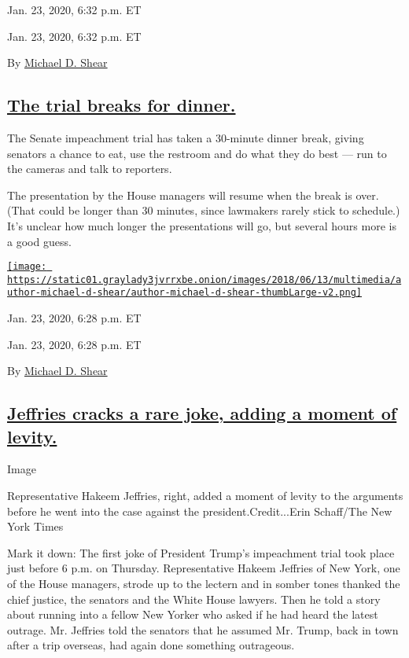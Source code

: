 Jan. 23, 2020, 6:32 p.m. ET

Jan. 23, 2020, 6:32 p.m. ET

By \href{https://www.nytimes3xbfgragh.onion/by/michael-d-shear}{Michael
D. Shear}

\hypertarget{the-trial-breaks-for-dinner}{%
\subsection{\texorpdfstring{\protect\hyperlink{the-trial-breaks-for-dinner}{The
trial breaks for
dinner.}}{The trial breaks for dinner.}}\label{the-trial-breaks-for-dinner}}

The Senate impeachment trial has taken a 30-minute dinner break, giving
senators a chance to eat, use the restroom and do what they do best ---
run to the cameras and talk to reporters.

The presentation by the House managers will resume when the break is
over. (That could be longer than 30 minutes, since lawmakers rarely
stick to schedule.) It's unclear how much longer the presentations will
go, but several hours more is a good guess.

\href{https://www.nytimes3xbfgragh.onion/by/michael-d-shear}{\texttt{[image: https://static01.graylady3jvrrxbe.onion/images/2018/06/13/multimedia/author-michael-d-shear/author-michael-d-shear-thumbLarge-v2.png]}}

Jan. 23, 2020, 6:28 p.m. ET

Jan. 23, 2020, 6:28 p.m. ET

By \href{https://www.nytimes3xbfgragh.onion/by/michael-d-shear}{Michael
D. Shear}

\hypertarget{jeffries-cracks-a-rare-joke-adding-a-moment-of-levity}{%
\subsection{\texorpdfstring{\protect\hyperlink{jeffries-joke}{Jeffries
cracks a rare joke, adding a moment of
levity.}}{Jeffries cracks a rare joke, adding a moment of levity.}}\label{jeffries-cracks-a-rare-joke-adding-a-moment-of-levity}}

Image

Representative Hakeem Jeffries, right, added a moment of levity to the
arguments before he went into the case against the
president.Credit...Erin Schaff/The New York Times

Mark it down: The first joke of President Trump's impeachment trial took
place just before 6 p.m. on Thursday. Representative Hakeem Jeffries of
New York, one of the House managers, strode up to the lectern and in
somber tones thanked the chief justice, the senators and the White House
lawyers. Then he told a story about running into a fellow New Yorker who
asked if he had heard the latest outrage. Mr. Jeffries told the senators
that he assumed Mr. Trump, back in town after a trip overseas, had again
done something outrageous.

